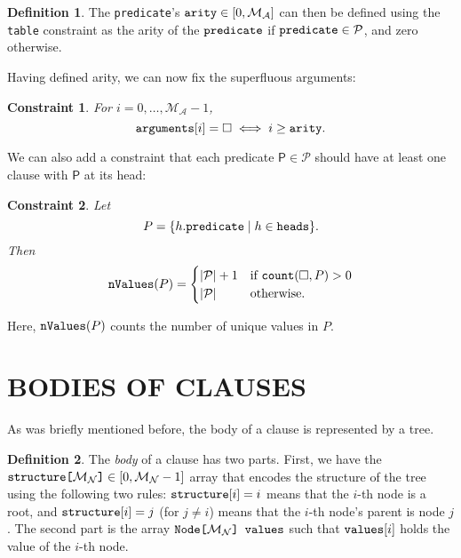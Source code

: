 \documentclass[letterpaper]{article}
\newtheorem{constraint}{Constraint}
\theoremstyle{definition}
\newtheorem{definition}{Definition}
\newcommand{\variable}[1]{\texttt{\textup{#1}}}
\newcommand{\arrayd}[3]{\variable{{#1}[}{#2}\variable{]} \in {#3}}
\newcommand{\arrayt}[3]{\variable{{#3}[}{#2}\variable{] {#1}}}
\newcommand{\predicates}{\mathcal{P}}
\newcommand{\maxArity}{\mathcal{M}_{\mathcal{A}}}
\newcommand{\maxNumNodes}{\mathcal{M}_{\mathcal{N}}}
\begin{document}
\begin{definition} \label{def:arity}
  The \variable{predicate}'s $\variable{arity} \in [0, \maxArity{}]$ can then be
  defined using the \variable{table} constraint as the arity of the
  $\variable{predicate}$ if $\variable{predicate} \in \predicates{}$, and zero
  otherwise.
\end{definition}

Having defined arity, we can now fix the superfluous arguments:

\begin{constraint} \label{constr:arity}
  For $i = 0, \dots, \maxArity{} - 1$,
  \[
    \variable{arguments}[i] = \Box \iff i \ge \variable{arity}.
  \]
\end{constraint}

We can also add a constraint that each predicate $\mathsf{P} \in \predicates{}$
should have at least one clause with $\mathsf{P}$ at its head:

\begin{constraint}
Let
  \[
    P = \{ h.\variable{predicate} \mid h \in \variable{heads} \}.
  \]
  Then
  \[
    \variable{nValues}(P) =
    \begin{cases}
      |\predicates{}| + 1 & \text{if } \variable{count}(\Box, P) > 0 \\
      |\predicates{}| & \text{otherwise.}
    \end{cases}
  \]
\end{constraint}

Here, $\variable{nValues}(P)$ counts the number of unique values in $P$.

\section{BODIES OF CLAUSES} \label{sec:bodies}

As was briefly mentioned before, the body of a clause is represented by a tree.

\begin{definition}
  The \emph{body} of a clause has two parts. First, we have the
  $\arrayd{structure}{\maxNumNodes{}}{[0, \maxNumNodes{} - 1]}$ array that
  encodes the structure of the tree using the following two rules:
  $\variable{structure}[i] = i$ means that the $i$-th node is a root, and
  $\variable{structure}[i] = j$ (for $j \ne i$) means that the $i$-th node's
  parent is node $j$. The second part is the array
  $\arrayt{values}{\maxNumNodes{}}{Node}$ such that $\variable{values}[i]$ holds
  the value of the $i$-th node.
\end{definition}
\end{document}
